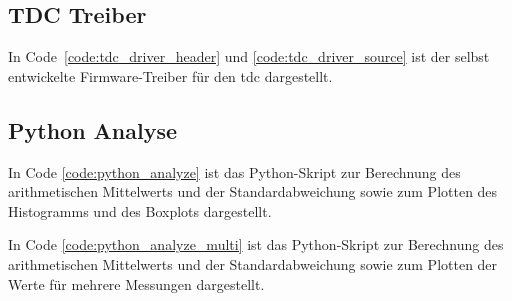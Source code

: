 \subsection{TDC Treiber}\label{sec:tdc_driver}

In Code~\ref{code:tdc_driver_header} und \ref{code:tdc_driver_source} ist der selbst entwickelte Firmware-Treiber für
den \acrshort{tdc} dargestellt.




\subsection{Python Analyse}\label{sec:python_analyze}

In Code \ref{code:python_analyze} ist das Python-Skript zur Berechnung des arithmetischen Mittelwerts und der
Standardabweichung sowie zum Plotten des Histogramms und des Boxplots dargestellt.



In Code \ref{code:python_analyze_multi} ist das Python-Skript zur Berechnung des arithmetischen Mittelwerts und der
Standardabweichung sowie zum Plotten der Werte für mehrere Messungen dargestellt.



\pagebreak


